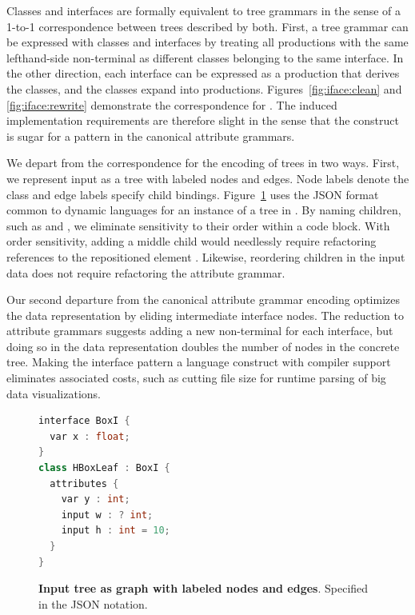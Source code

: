 Classes and interfaces are formally equivalent to tree grammars in the sense of a 1-to-1 correspondence between trees described by both. First, a tree grammar can be expressed with classes and interfaces by treating all productions with the same lefthand-side non-terminal as different classes belonging to the same interface. In the other direction, each interface can be expressed as a production that derives the classes, and the classes expand into productions. Figures~\ref{fig:iface:clean} and \ref{fig:iface:rewrite} demonstrate the correspondence for \hlang. The induced implementation requirements are therefore slight in the sense that the construct is sugar for a pattern in the canonical attribute grammars. 

We depart from the correspondence for the encoding of trees in two ways. First, we represent input as a tree with labeled nodes and edges. Node labels denote the class and edge labels specify child bindings. Figure~\ref{fig:hboxjson} uses the JSON format common to dynamic languages for an instance of a tree in \hlang. By naming children, such as  and , we eliminate sensitivity to their order within a code block. With order sensitivity, adding a middle child  would needlessly require refactoring references to the repositioned element . Likewise, reordering children in the input data does not require refactoring the attribute grammar.

Our second departure from the canonical attribute grammar encoding optimizes the data representation by eliding intermediate interface nodes. The reduction to attribute grammars suggests adding a new non-terminal for each interface, but doing so in the data representation doubles the number of nodes in the concrete tree. Making the interface pattern a language construct with compiler support eliminates associated costs, such as cutting file size for runtime parsing of big data visualizations.

\begin{figure}
\centering
\begin{minipage}{0.8\columnwidth}
\begin{lstlisting}[language=C++,morekeywords={interface,class,var,input,int,float}]
interface BoxI {
  var x : float;
}
class HBoxLeaf : BoxI {
  attributes {
    var y : int;
    input w : ? int;
    input h : int = 10;
  }
}
\end{lstlisting}
\end{minipage}
\caption{\textbf{Input tree as graph with labeled nodes and edges}. Specified in the JSON notation.}
\label{fig:hboxjson}
\end{figure}


